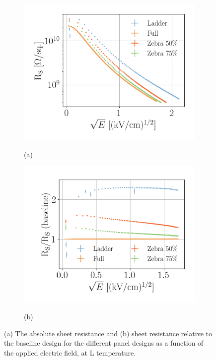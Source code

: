 \documentclass[a4paper,12pt]{article}
\begin{document}
\begin{figure}[htb]
\centering
\begin{subfigure}[c]{0.32\textheight}
	\begin{center}
		\includegraphics[width=\textwidth]{r_vs_e_0-5_dr8_multiple_ln2.png}
		
		\vspace*{-\baselineskip} \hspace{1em} (a)
	\end{center}
\end{subfigure}
\begin{subfigure}[c]{0.32\textheight}
	\begin{center}
		\includegraphics[width=\textwidth]{r_s_vs_e_0-5_dr8_multiple_ln2_ratio.png}
		
		\vspace*{-\baselineskip} \hspace{2em} (b)
	\end{center}
\end{subfigure}
\caption{(a) The absolute sheet resistance and (b) sheet resistance relative to the baseline design for the different panel designs as a function of the applied electric field, at L temperature.} 
\label{fig:alt_design_res}
\end{figure}
\end{document}
